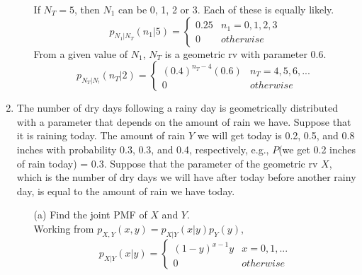 \documentclass{report}
\begin{document}
\begin{enumerate}
\begin{itemize}
If $N_T = 5$, then $N_1$ can be 0, 1, 2 or 3. Each of these is equally likely.
$$p_{N_1|N_T}(n_1|5) = \left. \begin{cases}
0.25 & n_1 = 0,1,2,3 \\
0 & otherwise
\end{cases} \right.$$
From a given value of $N_1$, $N_T$ is a geometric rv with parameter 0.6.
$$p_{N_T|N_!}(n_T|2) = \left. \begin{cases}
(0.4)^{n_T - 4}(0.6) & n_T = 4, 5, 6,... \\
0 & otherwise
\end{cases} \right.$$
\end{itemize}
\item The number of dry days following a rainy day is geometrically distributed with a parameter that
depends on the amount of rain we have. Suppose that it is raining today. The amount of rain $Y$ we
will get today is 0.2, 0.5, and 0.8 inches with probability 0.3, 0.3, and 0.4, respectively, e.g., $P$(we
get 0.2 inches of rain today) = 0.3. Suppose that the parameter of the geometric rv $X$, which is the
number of dry days we will have after today before another rainy day, is equal to the amount of rain
we have today.
\begin{itemize}
\item[(a)] Find the joint PMF of $X$ and $Y$. \\
Working from $p_{X,Y}(x,y) = p_{X|Y}(x|y)p_Y(y)$,
$$ p_{X|Y}(x|y) = \left. \begin{cases}
(1-y)^{x-1}y & x = 0,1,... \\
0 & otherwise
\end{cases} \right.$$


\end{itemize}
\end{enumerate}
\end{document}
